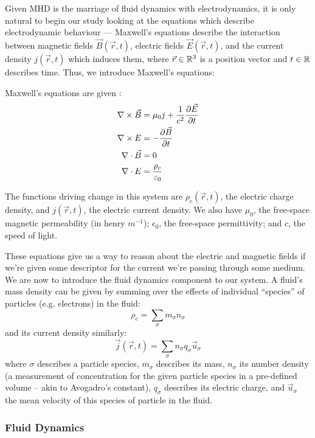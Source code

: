 Given MHD is the marriage of fluid dynamics with electrodynamics, it is only natural to begin our 
study looking at the equations which describe electrodynamic behaviour --- Maxwell's equations 
describe the interaction between magnetic fields $\vec{B}(\vec{r}, t)$, electric fields $\vec{E}(\vec{r}, t)$, and 
the current density $j(\vec{r}, t)$ which induces them, where $\vec{r} \in \mathbb{R}^3$ is a position vector and $t \in \mathbb{R}$ describes time. Thus, we introduce Maxwell's equations:
\begin{definition}
    Maxwell's equations are given \cite{wesson-tokamaks}:
    \begin{align}
        \nabla \times \vec{B} &= \mu_0 j + \frac{1}{c^2} \pdv{\vec{E}}{t} \\
        \nabla \times E &= -\pdv{\vec{B}}{t} \\
        \nabla \cdot \vec{B} &= 0 \\
        \nabla \cdot E &= \frac{\rho_c}{\varepsilon_0}
    \end{align}

    The functions driving change in this system are $\rho_c(\vec{r}, t)$, the electric charge density, and $j(\vec{r}, t)$, 
    the electric current density. We also have $\mu_0$, the free-space magnetic permeability (in henry $m^{-1}$); $\epsilon_0$, 
    the free-space permittivity; and $c$, the speed of light.
    
\end{definition}

These equations give us a way to reason about the electric and magnetic fields if we're given some descriptor for the 
current we're passing through some medium. We are now to introduce the fluid dynamics component to our system. A fluid's 
mass density can be given by summing over the effects of individual ``species'' of particles (e.g. electrons) in the fluid:
$$\rho_c = \sum_{\sigma} m_{\sigma} n_{\sigma}$$
and its current density similarly:
$$\vec{j}(\vec{r}, t) = \sum_{\sigma} n_{\sigma} q_{\sigma} \vec{u}_{\sigma}$$
where $\sigma$ describes a particle species, $m_\sigma$ describes its mass, $n_\sigma$ its number density 
(a measurement of concentration for the given particle species in a pre-defined volume -- akin to Avogadro's constant), 
$q_\sigma$ describes its electric charge, and $\vec{u}_\sigma$ the mean velocity of this species of particle in the fluid. 

\subsubsection{Fluid Dynamics}

